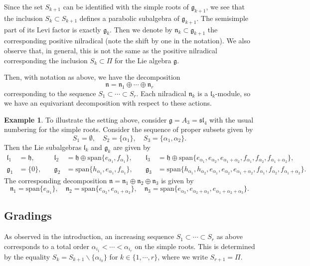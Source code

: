 \documentclass[a4paper, 12pt, reqno, english]{amsart}
\numberwithin{equation}{section}
\numberwithin{figure}{section}
\theoremstyle{plain}
\theoremstyle{plain}
\theoremstyle{plain}
\theoremstyle{plain}
\theoremstyle{plain}
\theoremstyle{definition}
\theoremstyle{definition}
\theoremstyle{definition}
\newtheorem{example}[theorem]{Example}
\theoremstyle{remark}
\theoremstyle{definition}
\theoremstyle{definition}
\newcommand{\lieg}{\mathfrak{g}}
\newcommand{\lieh}{\mathfrak{h}}
\newcommand{\liel}{\mathfrak{l}}
\newcommand{\lien}{\mathfrak{n}}
\newcommand{\simpleroots}{\Pi}
\newcommand{\lspan}{\mathrm{span}}
\begin{document}
Since the set $S_{k + 1}$ can be identified with the simple roots of $\lieg_{k + 1}$, we see that the inclusion $S_k \subset S_{k + 1}$ defines a parabolic subalgebra of $\lieg_{k + 1}$.
The semisimple part of its Levi factor is exactly $\lieg_k$.
Then we denote by $\lien_k \subset \lieg_{k + 1}$ the corresponding positive nilradical (note the shift by one in the notation).
We also observe that, in general, this is not the same as the positive nilradical corresponding the inclusion $S_k \subset \simpleroots$ for the Lie algebra $\lieg$.

Then, with notation as above, we have the decomposition
\[
\lien = \lien_1 \oplus \cdots \oplus \lien_r
\]
corresponding to the sequence $S_1 \subset \cdots \subset S_r$.
Each nilradical $\lien_k$ is a $\liel_k$-module, so we have an equivariant decomposition with respect to these actions.

\begin{example}
To illustrate the setting above, consider $\lieg = A_3 = \mathfrak{sl}_4$ with the usual numbering for the simple roots.
Consider the sequence of proper subsets given by
\[
S_1 = \emptyset, \quad
S_2 = \{ \alpha_1 \}, \quad
S_3 = \{ \alpha_1, \alpha_2 \}.
\]
Then the Lie subalgebras $\liel_k$ and $\lieg_k$ are given by
\begin{align*}
\liel_1 & = \lieh, \quad &
\liel_2 & = \lieh \oplus \lspan \{ e_{\alpha_1}, f_{\alpha_1} \}, \quad &
\liel_3 & = \lieh \oplus \lspan \{ e_{\alpha_1}, e_{\alpha_2}, e_{\alpha_1 + \alpha_2}, f_{\alpha_1}, f_{\alpha_2}, f_{\alpha_1 + \alpha_2} \}, \\
\lieg_1 & = \{ 0 \}, \quad &
\lieg_2 & = \lspan \{ h_{\alpha_1}, e_{\alpha_1}, f_{\alpha_1} \}, \quad &
\lieg_3 & = \lspan \{ h_{\alpha_1}, h_{\alpha_2}, e_{\alpha_1}, e_{\alpha_2}, e_{\alpha_1 + \alpha_2}, f_{\alpha_1}, f_{\alpha_2}, f_{\alpha_1 + \alpha_2} \}.
\end{align*}
The corresponding decomposition $\lien = \lien_1 \oplus \lien_2 \oplus \lien_3$ is given by
\[
\lien_1 = \lspan \{ e_{\alpha_1} \}, \quad
\lien_2 = \lspan \{ e_{\alpha_2}, e_{\alpha_1 + \alpha_2} \}, \quad
\lien_3 = \lspan \{ e_{\alpha_3}, e_{\alpha_2 + \alpha_3}, e_{\alpha_1 + \alpha_2 + \alpha_3} \}.
\]
\end{example}

\subsection{Gradings}

As observed in the introduction, an increasing sequence $S_1 \subset \cdots \subset S_r$ as above corresponds to a total order $\alpha_{i_1} < \cdots < \alpha_{i_r}$ on the simple roots.
This is determined by the equality $S_k = S_{k + 1} \backslash \{ \alpha_{i_k} \}$ for $k \in \{ 1, \cdots, r \}$, where we write $S_{r + 1} = \simpleroots$.
\end{document}
